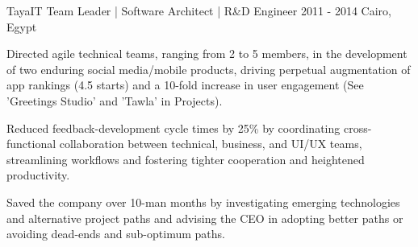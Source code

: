 \begin{cventries}


  \cventry
    {TayaIT} %
    {Team Leader | Software Architect | R\&D Engineer} %
    {2011 - 2014} %
    {Cairo, Egypt} %
    {
      \begin{cvitems} %
		\item {Directed agile technical teams, ranging from 2 to 5 members, in the development of two enduring social media/mobile products, driving perpetual augmentation of app rankings (4.5 starts) and a 10-fold increase in user engagement (See 'Greetings Studio' and 'Tawla' in Projects).}
		\item {Reduced feedback-development cycle times by 25\% by coordinating cross-functional collaboration between technical, business, and UI/UX teams, streamlining workflows and fostering tighter cooperation and heightened productivity.}
		\item {Saved the company over 10-man months by investigating emerging technologies and alternative project paths and advising the CEO in adopting better paths or avoiding dead-ends and sub-optimum paths.}
      \end{cvitems}
    }





\end{cventries}
